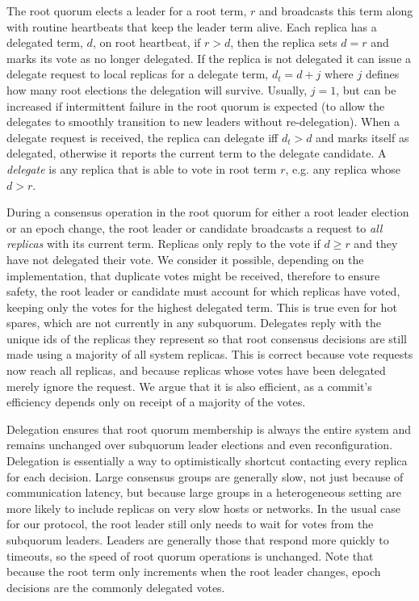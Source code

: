 \documentclass[10pt,conference]{IEEEtran}
\newcommand{\roo}{root quorum\xspace}
\begin{document}
The \roo elects a leader for a root term, $r$ and broadcasts this term along with
routine heartbeats that keep the leader term alive.
Each replica has a delegated term, $d$, on root heartbeat, if $r>d$, then the replica
sets $d=r$ and marks its vote as no longer delegated.
If the replica is not delegated it can issue a delegate request to local replicas for a
delegate term, $d_t=d+j$ where $j$ defines how many root elections the delegation will
survive.
Usually, $j=1$, but can be increased if intermittent failure in the root quorum is
expected (to allow the delegates to smoothly transition to new leaders without
re-delegation).
When a delegate request is received, the replica can delegate iff $d_t>d$ and marks
itself as delegated, otherwise it reports the current term to the delegate candidate.
A \emph{delegate} is any replica that is able to vote in root term $r$, e.g. any replica
whose $d>r$.

During a consensus operation in the \roo for either a root leader election or an epoch
change, the root leader or candidate broadcasts a request to \emph{all replicas} with
its current term.
Replicas only reply to the vote if $d \ge r$ and they have not delegated their vote.
We consider it possible, depending on the implementation, that duplicate votes might be
received, therefore to ensure safety, the root leader or candidate must account for
which replicas have voted, keeping only the votes for the highest delegated term.
This is true even for hot spares, which are not currently in any subquorum.
Delegates reply with the unique ids of the replicas they represent so that root
consensus decisions are still made using a majority of all system replicas.
This is correct because vote requests now reach all replicas, and because replicas whose
votes have been delegated merely ignore the request.
We argue that it is also efficient, as a commit's efficiency depends only on receipt of
a majority of the votes.

Delegation ensures that root quorum membership is always the entire system and remains
unchanged over subquorum leader elections and even reconfiguration.
Delegation is essentially a way to optimistically shortcut contacting every replica for
each decision.
Large consensus groups are generally slow, not just because of communication latency,
but because large groups in a heterogeneous setting are more likely to include replicas
on very slow hosts or networks.
In the usual case for our protocol, the root leader still only needs to wait for votes
from the subquorum leaders.
Leaders are generally those that respond more quickly to timeouts, so the speed of root
quorum operations is unchanged.
Note that because the root term only increments when the root leader changes,
epoch decisions are the commonly delegated votes.
\end{document}

